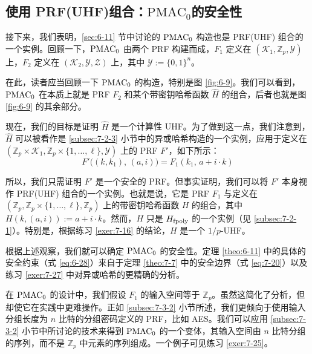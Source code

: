 \subsection{使用 PRF(UHF)组合：$\mathrm{PMAC}_0$的安全性}\label{subsec:7-3-3}

接下来，我们表明，\ref{sec:6-11} 节中讨论的 $\rm PMAC_0$ 构造也是 PRF(UHF) 组合的一个实例。回顾一下，$\rm PMAC_0$ 由两个 PRF 构建而成，$F_1$ 定义在 $(\mathcal{K}_1,\mathbb{Z}_p,\mathcal{Y})$ 上，$F_2$ 定义在 $(\mathcal{K}_2,\mathcal{Y},\mathcal{Z})$ 上，其中 $\mathcal{Y}:=\{0,1\}^n$。

在此，读者应当回顾一下 $\rm PMAC_0$ 的构造，特别是图 \ref{fig:6-9}。我们可以看到，$\rm PMAC_0$ 在本质上就是 PRF $F_2$ 和某个带密钥哈希函数 $\widehat{H}$ 的组合，后者也就是图 \ref{fig:6-9} 的其余部分。

现在，我们的目标是证明 $\widehat{H}$ 是一个计算性 UHF。为了做到这一点，我们注意到，$\widehat{H}$ 可以被看作是 \ref{subsec:7-2-3} 小节中的异或哈希构造的一个实例，应用于定义在 $(\mathbb{Z}_p\times\mathcal{K}_1,\mathbb{Z}_p\times\{1,\dots,\ell\},\mathcal{Y})$ 上的 PRF $F'$，如下所示：
\[
F'\big((k,k_1),\,(a,i)\big)=F_1(k_1,\,a+i\cdot k)
\]

所以，我们只需证明 $F'$ 是一个安全的 PRF。但事实证明，我们可以将 $F'$ 本身视作 PRF(UHF) 组合的一个实例。也就是说，它是 PRF $F_1$ 与定义在 $(\mathbb{Z}_p,\mathbb{Z}_p\times\{1,\dots,\ell\},\mathbb{Z}_p)$ 上的带密钥哈希函数 $H$ 的组合，其中$H(k,(a,i)):=a+i\cdot k$。然而，$H$ 只是 $H_{\rm fpoly}$ 的一个实例（见 \ref{subsec:7-2-1}）。特别是，根据练习 \ref{exer:7-16} 的结论，$H$ 是一个 ${1}/{p}$-UHF。

根据上述观察，我们就可以确定 $\rm PMAC_0$ 的安全性。定理 \ref{theo:6-11} 中的具体的安全约束（式 \ref{eq:6-28}）来自于定理 \ref{theo:7-7} 中的安全边界（式 \ref{eq:7-20}）以及练习 \ref{exer:7-27} 中对异或哈希的更精确的分析。

在 $\rm PMAC_0$ 的设计中，我们假设 $F_1$ 的输入空间等于 $\mathbb{Z}_p$。虽然这简化了分析，但却使它在实践中更难操作。正如 \ref{subsec:7-3-2} 小节所述，我们更倾向于使用输入分组长度为 $n$ 比特的分组密码定义的 PRF，比如 AES。我们可以应用 \ref{subsec:7-3-2} 小节中所讨论的技术来得到 $\rm PMAC_0$ 的一个变体，其输入空间由 $n$ 比特分组的序列，而不是 $\mathbb{Z}_p$ 中元素的序列组成。一个例子可见练习 \ref{exer:7-25}。